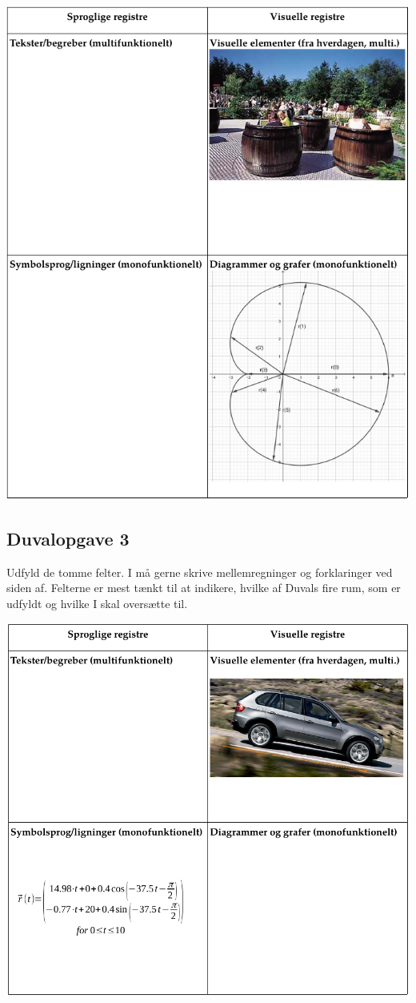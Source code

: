 \documentclass[a4paper, 12pt]{article}
\begin{document}
\begin{center}
\includegraphics[width=.9\linewidth]{img/duvalopgave_2.png}
\end{center}


\subsection*{Duvalopgave 3}
\label{sec:org70073d4}

Udfyld de tomme felter. I må gerne skrive mellemregninger og forklaringer ved siden af. Felterne er mest tænkt til at indikere, hvilke af Duvals fire rum, som er udfyldt og hvilke I skal oversætte til.

\begin{center}
\includegraphics[width=.9\linewidth]{img/duvalopgave_3.png}
\end{center}
\end{document}
